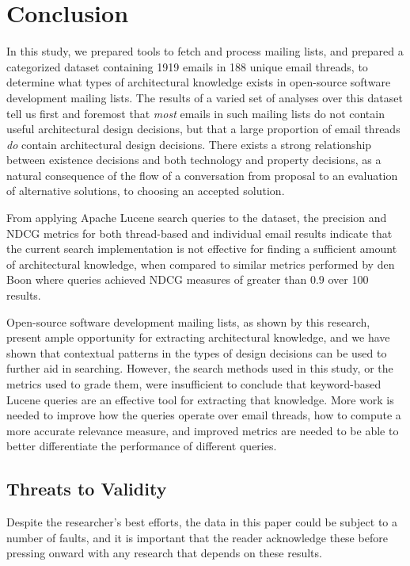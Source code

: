 \documentclass[a4paper, 12pt]{article}
\begin{document}
\section{Conclusion}
	In this study, we prepared tools to fetch and process mailing lists, and prepared a categorized dataset containing 1919 emails in 188 unique email threads, to determine what types of architectural knowledge exists in open-source software development mailing lists. The results of a varied set of analyses over this dataset tell us first and foremost that \textit{most} emails in such mailing lists do not contain useful architectural design decisions, but that a large proportion of email threads \textit{do} contain architectural design decisions. There exists a strong relationship between existence decisions and both technology and property decisions, as a natural consequence of the flow of a conversation from proposal to an evaluation of alternative solutions, to choosing an accepted solution.
	
	From applying Apache Lucene search queries to the dataset, the precision and NDCG metrics for both thread-based and individual email results indicate that the current search implementation is not effective for finding a sufficient amount of architectural knowledge, when compared to similar metrics performed by den Boon\cite{denboon} where queries achieved NDCG measures of greater than $ 0.9 $ over 100 results.
	
	Open-source software development mailing lists, as shown by this research, present ample opportunity for extracting architectural knowledge, and we have shown that contextual patterns in the types of design decisions can be used to further aid in searching. However, the search methods used in this study, or the metrics used to grade them, were insufficient to conclude that keyword-based Lucene queries are an effective tool for extracting that knowledge. More work is needed to improve how the queries operate over email threads, how to compute a more accurate relevance measure, and improved metrics are needed to be able to better differentiate the performance of different queries.
	
	\subsection{Threats to Validity}
		Despite the researcher's best efforts, the data in this paper could be subject to a number of faults, and it is important that the reader acknowledge these before pressing onward with any research that depends on these results.
		
\end{document}

